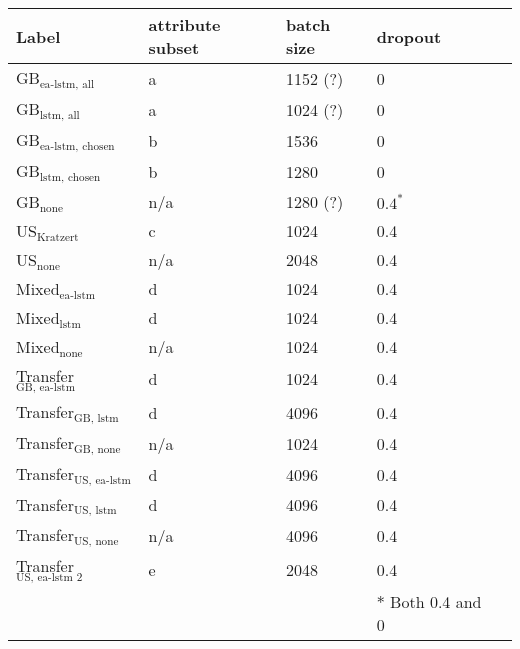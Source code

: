 \begin{tabular}{lllll}
    \toprule
    Label & attribute subset & batch size & dropout \\
    \midrule
    GB$_\text{ea-lstm, all}$ & a &  1152 (?)  & 0\\
    GB$_\text{lstm, all}$ & a & 1024 (?) & 0  \\
    GB$_\text{ea-lstm, chosen}$ & b & 1536 & 0 \\
    GB$_\text{lstm, chosen}$ & b & 1280 & 0\\
    GB$_\text{none}$ & n/a & 1280 (?) & $0.4^*$\\
    US$_\text{Kratzert}$  & c & 1024 & 0.4 \\
    US$_\text{none}$  & n/a & 2048 & 0.4\\
    Mixed$_\text{ea-lstm}$ & d & 1024 & 0.4\\
    Mixed$_\text{lstm}$ & d & 1024 & 0.4\\
    Mixed$_\text{none}$ & n/a & 1024 & 0.4\\
    Transfer$_\text{GB, ea-lstm}$ & d  & 1024 & 0.4 \\
    Transfer$_\text{GB, lstm}$ & d  & 4096 & 0.4\\
    Transfer$_\text{GB, none}$ & n/a & 1024 & 0.4 \\
    Transfer$_\text{US, ea-lstm}$ & d & 4096 & 0.4 \\
    Transfer$_\text{US, lstm}$  & d & 4096 & 0.4 \\ 
    Transfer$_\text{US, none}$  & n/a & 4096 & 0.4 \\
    Transfer$_\text{US, ea-lstm 2}$ & e & 2048 & 0.4 \\
    & & & $*$ Both 0.4 and 0 \\
\bottomrule
\end{tabular}
